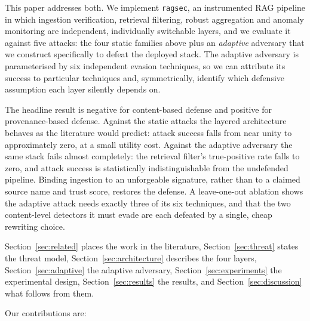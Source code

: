 \documentclass[information,article,submit,moreauthors]{Definitions/mdpi}
\begin{document}
This paper addresses both. We implement \texttt{ragsec}, an instrumented RAG pipeline in which
ingestion verification, retrieval filtering, robust aggregation and anomaly monitoring are
independent, individually switchable layers, and we evaluate it against five attacks: the four
static families above plus an \emph{adaptive} adversary that we construct specifically to
defeat the deployed stack. The adaptive adversary is parameterised by six independent evasion
techniques, so we can attribute its success to particular techniques and, symmetrically,
identify which defensive assumption each layer silently depends on.

The headline result is negative for content-based defense and positive for provenance-based
defense. Against the static attacks the layered architecture behaves as the literature would
predict: attack success falls from near unity to approximately zero, at a small utility cost.
Against the adaptive adversary the same stack fails almost completely: the retrieval
filter's true-positive rate falls to zero, and attack success is statistically
indistinguishable from the undefended pipeline. Binding ingestion to an unforgeable signature, rather than to a
claimed source name and trust score, restores the defense. A leave-one-out ablation shows the
adaptive attack needs exactly three of its six techniques, and that the two content-level
detectors it must evade are each defeated by a single, cheap rewriting choice.

Section~\ref{sec:related} places the work in the literature, Section~\ref{sec:threat} states
the threat model, Section~\ref{sec:architecture} describes the four layers,
Section~\ref{sec:adaptive} the adaptive adversary, Section~\ref{sec:experiments} the
experimental design, Section~\ref{sec:results} the results, and Section~\ref{sec:discussion}
what follows from them.

Our contributions are:
\end{document}
